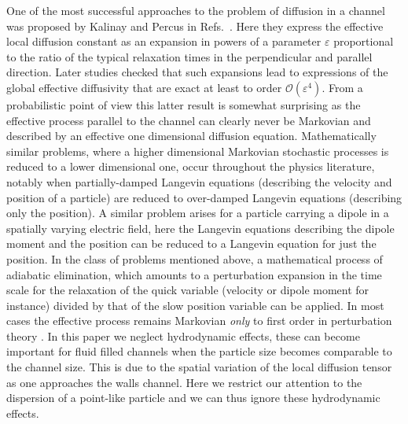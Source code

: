 \documentclass[pre,showpacs,preprintnumbers,amsmath,amssymb,superscriptaddress]{revtex4-1}
\begin{document}
One of the most successful approaches to the problem of diffusion in a channel was proposed
by Kalinay and Percus in Refs.~\cite{kal2005,kal2006}. %
Here they express the effective local diffusion constant as an expansion in powers of a parameter $\varepsilon$ proportional to the ratio of the typical relaxation times in the perpendicular and parallel direction. Later studies \cite{dorfman2014assessing} checked that such expansions lead to expressions of the global effective diffusivity that are exact at least to order $\mathcal{O}(\varepsilon^4)$. 
From a probabilistic point of view this latter result is somewhat surprising as the effective 
process parallel to the channel can clearly never be Markovian and described by an effective one dimensional diffusion equation. Mathematically similar problems, where a higher dimensional Markovian stochastic processes is reduced to a lower dimensional one, occur throughout the physics literature, notably when partially-damped Langevin equations 
(describing the velocity and position of a particle) are reduced to over-damped Langevin equations (describing only the position). A similar problem arises for a particle carrying a dipole in a spatially varying electric field, here the Langevin equations describing the dipole moment and the position can be  reduced to a Langevin equation for just the position.  In the class of problems mentioned above, a mathematical process of adiabatic elimination, which amounts to a perturbation expansion in the time scale for the relaxation of the quick variable (velocity or dipole moment for instance) divided by that of the slow position variable can be applied. In most cases the effective process remains Markovian \textit{only} to first order in perturbation theory \cite{mig1980,ris1996,tou2009}. 
In this paper we neglect hydrodynamic effects, these can become important for fluid filled channels \cite{yang2017} when the particle size becomes comparable to the channel size. This is due to the spatial variation of the local diffusion tensor as one approaches the walls channel. Here we  restrict our attention to   the dispersion of a point-like  particle and we can thus ignore these hydrodynamic effects.
\end{document}
